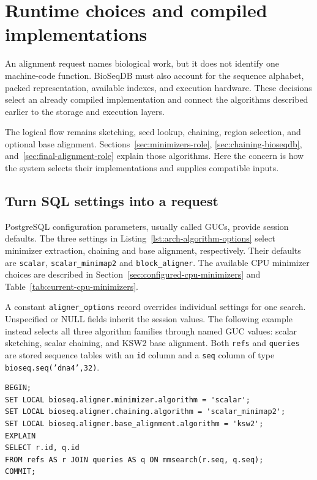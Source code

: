 \section{Runtime choices and compiled implementations}
\label{sec:arch-algorithm-selection}

An alignment request names biological work, but it does not identify one
machine-code function. BioSeqDB must also account for the sequence alphabet,
packed representation, available indexes, and execution hardware. These
decisions select an already compiled implementation and connect the algorithms
described earlier to the storage and execution layers.

The logical flow remains sketching, seed lookup, chaining, region selection,
and optional base alignment. Sections~\ref{sec:minimizers-role},
\ref{sec:chaining-bioseqdb}, and~\ref{sec:final-alignment-role} explain those
algorithms. Here the concern is how the system selects their implementations
and supplies compatible inputs.

\subsection{Turn SQL settings into a request}
\label{sec:arch-request-settings}

PostgreSQL configuration parameters, usually called GUCs, provide session
defaults. The three settings in Listing~\ref{lst:arch-algorithm-options}
select minimizer extraction, chaining and base alignment, respectively.
Their defaults are \texttt{scalar}, \texttt{scalar\_minimap2} and
\texttt{block\_aligner}. The available CPU minimizer choices are described in
Section~\ref{sec:configured-cpu-minimizers} and
Table~\ref{tab:current-cpu-minimizers}.

A constant \texttt{aligner\_options} record overrides individual settings
for one search. Unspecified or NULL fields inherit the session values.
The following example instead selects all three algorithm families through
named GUC values: scalar sketching, scalar chaining, and KSW2 base alignment.
Both \texttt{refs} and \texttt{queries} are stored sequence tables with an
\texttt{id} column and a \texttt{seq} column of type
\texttt{bioseq.seq('dna4',32)}.

\noindent\begin{minipage}{\linewidth}
\begin{lstlisting}[style=bioseq-search-sql,
  caption={Select algorithm families before planning a sequence join.},
  label={lst:arch-algorithm-options}]
BEGIN;
SET LOCAL bioseq.aligner.minimizer.algorithm = 'scalar';
SET LOCAL bioseq.aligner.chaining.algorithm = 'scalar_minimap2';
SET LOCAL bioseq.aligner.base_alignment.algorithm = 'ksw2';
EXPLAIN
SELECT r.id, q.id
FROM refs AS r JOIN queries AS q ON mmsearch(r.seq, q.seq);
COMMIT;
\end{lstlisting}
\end{minipage}

